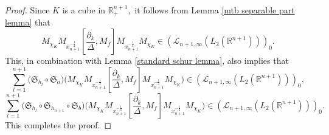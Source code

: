 \documentclass[12pt]{amsart}
\begin{document}
\begin{proof}
Since $K$ is a cube in $\mathbb{R}^{n+1}_+,$ it follows from Lemma \ref{mtb separable part lemma} that
 $$M_{\chi_K}M_{x_{n+1}^{-\frac12}}[\frac{\partial_k}{\Delta},M_f]M_{x_{n+1}^{-\frac12}}M_{\chi_K}\in (\mathcal{L}_{n+1,\infty}(L_2(\mathbb{R}^{n+1})))_0.$$
This, in combination with Lemma \ref{standard schur lemma}, also implies that
$$\sum_{l=1}^{n+1}\Big(\mathfrak{S}_{h_l}\circ\mathfrak{S}_a\Big)\Big(M_{\chi_K}M_{x_{n+1}^{-\frac12}}[\frac{\partial_k}{\Delta},M_f]M_{x_{n+1}^{-\frac12}}M_{\chi_K}\Big)\in (\mathcal{L}_{n+1,\infty}(L_2(\mathbb{R}^{n+1})))_0,$$
$$\sum_{l=1}^{n+1}\Big(\mathfrak{S}_{h_l}\circ\mathfrak{S}_{h_{n+1}}\circ\mathfrak{S}_b\Big)\Big(M_{\chi_K}M_{x_{n+1}^{-\frac12}}[\frac{\partial_k}{\Delta},M_f]M_{x_{n+1}^{-\frac12}}M_{\chi_K}\Big)\in (\mathcal{L}_{n+1,\infty}(L_2(\mathbb{R}^{n+1})))_0.$$
This completes the proof.
\end{proof}
\end{document}

